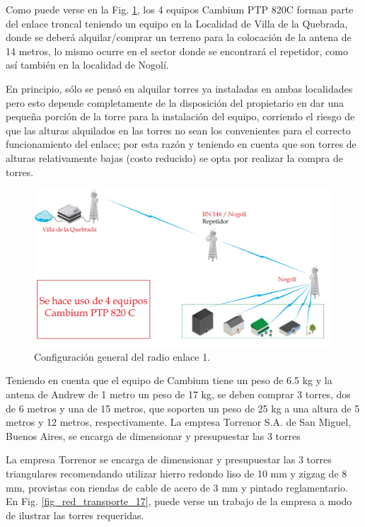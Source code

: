 \documentclass[12pt,a4paper]{book}
\begin{document}
Como puede verse en la Fig. \ref{fig_red_transporte_16}, los 4 equipos Cambium PTP 820C forman parte del enlace troncal teniendo un equipo en la Localidad de Villa de la Quebrada, donde se deberá alquilar/comprar un terreno para la colocación de la antena de 14 metros, lo mismo ocurre en el sector donde se encontrará el repetidor, como así también en la localidad de Nogolí.

\medskip
En principio, sólo se pensó en alquilar torres ya instaladas en ambas localidades pero esto depende completamente de la disposición del propietario en dar una pequeña porción de la torre para la instalación del equipo, corriendo el riesgo de que las alturas alquilados en las torres no sean los convenientes para el correcto funcionamiento del enlace; por esta razón y teniendo en cuenta que son torres de alturas relativamente bajas (costo reducido) se opta por realizar la compra de torres.


\begin{figure}
\centering
\includegraphics[width= 12 cm]{../figuras/red_transporte_16.jpg}
\caption{Configuración general del radio enlace 1.}
\label{fig_red_transporte_16}
\end{figure}

Teniendo en cuenta que el equipo de Cambium tiene un peso de 6.5 kg y la antena de Andrew de 1 metro un peso de 17 kg, se deben comprar 3 torres, dos de 6 metros y una de 15 metros, que soporten un peso de 25 kg a una altura de 5 metros y 12 metros, respectivamente. La empresa Torrenor S.A. de San Miguel, Buenos Aires, se encarga de dimensionar y presupuestar las 3 torres

La empresa Torrenor se encarga de dimensionar y presupuestar las 3 torres triangulares recomendando utilizar hierro redondo liso de 10 mm y zigzag de 8 mm, provistas con riendas de cable de acero de 3 mm y pintado reglamentario. 
En Fig. \ref{fig_red_transporte_17}, puede verse un trabajo de la empresa a modo de ilustrar las torres requeridas.
\end{document}
